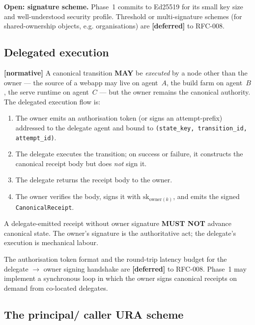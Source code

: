 \documentclass[11pt,a4paper]{article}
\newcommand{\normsv}{\textcolor{normativecolor}{\textbf{[normative]}}\xspace}
\newcommand{\deferred}{\textcolor{deferredcolor}{\textbf{[deferred]}}\xspace}
\theoremstyle{definition}
\begin{document}
\begin{decisionbox}
\textbf{Open: signature scheme.} Phase~1 commits to Ed25519 for
its small key size and well-understood security profile.
Threshold or multi-signature schemes (for shared-ownership
objects, e.g. organisations) are \deferred{} to RFC-008.
\end{decisionbox}

\subsection{Delegated execution}

\normsv{}
A canonical transition \textbf{MAY} be \emph{executed} by a node
other than the owner --- the source of a webapp may live on
agent~$A$, the build farm on agent~$B$, the serve runtime on
agent~$C$ --- but the owner remains the canonical authority. The
delegated execution flow is:

\begin{enumerate}[leftmargin=2.5em,itemsep=0.3em]
    \item The owner emits an authorisation token (or signs an
    attempt-prefix) addressed to the delegate agent and bound to
    \texttt{(state\_key, transition\_id, attempt\_id)}.
    \item The delegate executes the transition; on success or
    failure, it constructs the canonical receipt body but does
    \emph{not} sign it.
    \item The delegate returns the receipt body to the owner.
    \item The owner verifies the body, signs it with
    $\mathrm{sk}_{\mathrm{owner}(k)}$, and emits the signed
    \texttt{CanonicalReceipt}.
\end{enumerate}

A delegate-emitted receipt without owner signature \textbf{MUST
NOT} advance canonical state. The owner's signature is the
authoritative act; the delegate's execution is mechanical labour.

\begin{notebox}
The authorisation token format and the round-trip latency
budget for the delegate $\to$ owner signing handshake are
\deferred{} to RFC-008. Phase~1 may implement a synchronous
loop in which the owner signs canonical receipts on demand from
co-located delegates.
\end{notebox}

\subsection{The principal/ caller URA scheme}
\label{sec:caller-ura}
\end{document}
